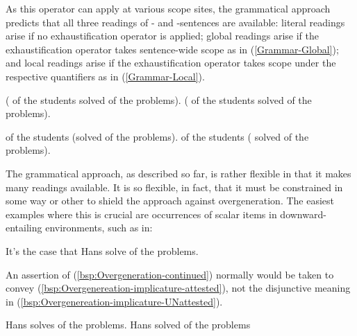 \documentclass[fleqn,reqno,10pt,draft]{article}
\newcommand{\as}{\acro{as}}
\renewcommand{\es}{\acro{es}}
\newcommand{\exh}{\ensuremath{\mathrm{Exh}}}
\begin{document}
As this operator can apply at various scope sites, the grammatical
approach predicts that all three readings of \as- and \es-sentences
are available: literal readings arise if no exhaustification operator
is applied; global readings arise if the exhaustification operator
takes sentence-wide scope as in (\ref{Grammar-Global}); and local
readings arise if the exhaustification operator takes scope under the
respective quantifiers as in (\ref{Grammar-Local}).

\begin{exe}
  \ex \label{Grammar-Global}
    \begin{xlist}
      \ex \label{Grammar-Global-AE} \mymark{$\exh$}( of the students solved
         of the problems).
      \ex \label{Grammar-Global-GE} \mymark{$\exh$}( of the students solved
         of the problems).
    \end{xlist}
\end{exe}

\begin{exe}
  \ex \label{Grammar-Local}
    \begin{xlist}
      \ex \label{Grammar-Local-AE}  of the students \mymark{$\exh$}(solved
         of the problems).
      \ex \label{Grammar-Local-GE}  of the
        students \mymark{$\exh$}( solved
         of the problems).
    \end{xlist}
\end{exe}

The grammatical approach, as described so far, is rather flexible in
that it makes many readings available. It is so flexible, in fact,
that it must be constrained in some way or other to shield the
approach against overgeneration. The easiest examples where this is
crucial are occurrences of scalar items in downward-entailing
environments, such as in:

\begin{exe}
\ex \label{bsp:Overgenereation-target} It's  the case that
  Hans solve  of the problems.
\end{exe}

\noindent An assertion of (\ref{bsp:Overgeneration-continued})
normally would be taken to convey
(\ref{bsp:Overgenereation-implicature-attested}), not the disjunctive
meaning in (\ref{bsp:Overgenereation-implicature-UNattested}).

\begin{exe}
\ex 
  \begin{xlist}
  \ex \label{bsp:Overgenereation-implicature-attested} Hans solves  of the problems.
  \ex \label{bsp:Overgenereation-implicature-UNattested} Hans solved
     of the problems 
  \end{xlist}
\end{exe}
\end{document}
